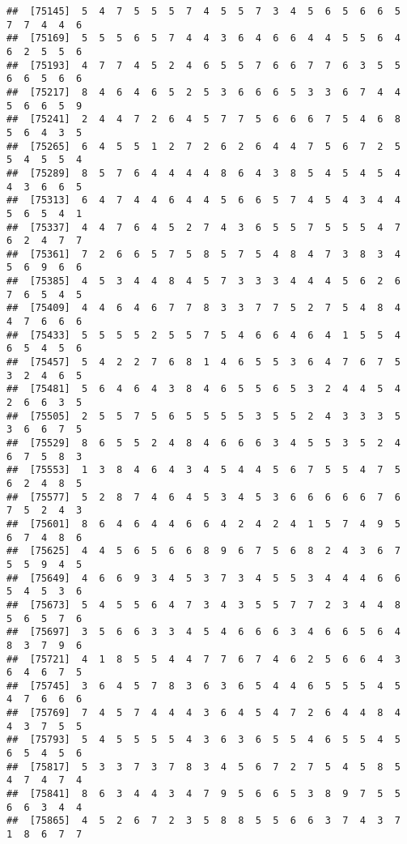 \documentclass[
]{book}
\begin{document}
\begin{verbatim}
##  [75145]  5  4  7  5  5  5  7  4  5  5  7  3  4  5  6  5  6  6  5  7  7  4  4  6
##  [75169]  5  5  5  6  5  7  4  4  3  6  4  6  6  4  4  5  5  6  4  6  2  5  5  6
##  [75193]  4  7  7  4  5  2  4  6  5  5  7  6  6  7  7  6  3  5  5  6  6  5  6  6
##  [75217]  8  4  6  4  6  5  2  5  3  6  6  6  5  3  3  6  7  4  4  5  6  6  5  9
##  [75241]  2  4  4  7  2  6  4  5  7  7  5  6  6  6  7  5  4  6  8  5  6  4  3  5
##  [75265]  6  4  5  5  1  2  7  2  6  2  6  4  4  7  5  6  7  2  5  5  4  5  5  4
##  [75289]  8  5  7  6  4  4  4  4  8  6  4  3  8  5  4  5  4  5  4  4  3  6  6  5
##  [75313]  6  4  7  4  4  6  4  4  5  6  6  5  7  4  5  4  3  4  4  5  6  5  4  1
##  [75337]  4  4  7  6  4  5  2  7  4  3  6  5  5  7  5  5  5  4  7  6  2  4  7  7
##  [75361]  7  2  6  6  5  7  5  8  5  7  5  4  8  4  7  3  8  3  4  5  6  9  6  6
##  [75385]  4  5  3  4  4  8  4  5  7  3  3  3  4  4  4  5  6  2  6  7  6  5  4  5
##  [75409]  4  4  6  4  6  7  7  8  3  3  7  7  5  2  7  5  4  8  4  4  7  6  6  6
##  [75433]  5  5  5  5  2  5  5  7  5  4  6  6  4  6  4  1  5  5  4  6  5  4  5  6
##  [75457]  5  4  2  2  7  6  8  1  4  6  5  5  3  6  4  7  6  7  5  3  2  4  6  5
##  [75481]  5  6  4  6  4  3  8  4  6  5  5  6  5  3  2  4  4  5  4  2  6  6  3  5
##  [75505]  2  5  5  7  5  6  5  5  5  5  3  5  5  2  4  3  3  3  5  3  6  6  7  5
##  [75529]  8  6  5  5  2  4  8  4  6  6  6  3  4  5  5  3  5  2  4  6  7  5  8  3
##  [75553]  1  3  8  4  6  4  3  4  5  4  4  5  6  7  5  5  4  7  5  6  2  4  8  5
##  [75577]  5  2  8  7  4  6  4  5  3  4  5  3  6  6  6  6  6  7  6  7  5  2  4  3
##  [75601]  8  6  4  6  4  4  6  6  4  2  4  2  4  1  5  7  4  9  5  6  7  4  8  6
##  [75625]  4  4  5  6  5  6  6  8  9  6  7  5  6  8  2  4  3  6  7  5  5  9  4  5
##  [75649]  4  6  6  9  3  4  5  3  7  3  4  5  5  3  4  4  4  6  6  5  4  5  3  6
##  [75673]  5  4  5  5  6  4  7  3  4  3  5  5  7  7  2  3  4  4  8  5  6  5  7  6
##  [75697]  3  5  6  6  3  3  4  5  4  6  6  6  3  4  6  6  5  6  4  8  3  7  9  6
##  [75721]  4  1  8  5  5  4  4  7  7  6  7  4  6  2  5  6  6  4  3  6  4  6  7  5
##  [75745]  3  6  4  5  7  8  3  6  3  6  5  4  4  6  5  5  5  4  5  4  7  6  6  6
##  [75769]  7  4  5  7  4  4  4  3  6  4  5  4  7  2  6  4  4  8  4  4  3  7  5  5
##  [75793]  5  4  5  5  5  5  4  3  6  3  6  5  5  4  6  5  5  4  5  6  5  4  5  6
##  [75817]  5  3  3  7  3  7  8  3  4  5  6  7  2  7  5  4  5  8  5  4  7  4  7  4
##  [75841]  8  6  3  4  4  3  4  7  9  5  6  6  5  3  8  9  7  5  5  6  6  3  4  4
##  [75865]  4  5  2  6  7  2  3  5  8  8  5  5  6  6  3  7  4  3  7  1  8  6  7  7

\end{verbatim}
\end{document}
